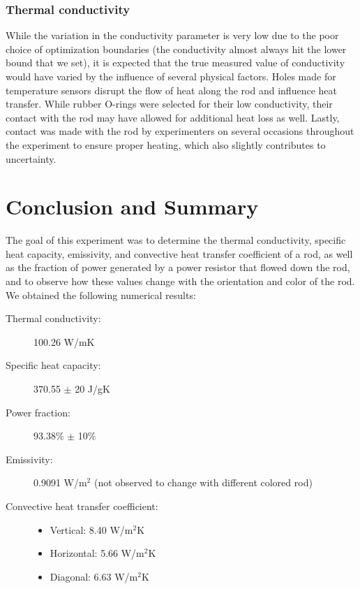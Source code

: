 \documentclass[letterpaper,titlepage,oneside]{report}
\begin{document}
\subsection*{Thermal conductivity}
While the variation in the conductivity parameter is very low due
to the poor choice of optimization boundaries (the conductivity almost
always hit the lower bound that we set), it is expected that the
true measured value of conductivity would have varied by the
influence of several physical factors. Holes made for temperature
sensors disrupt the flow of heat along the rod and influence
heat transfer. While rubber O-rings were selected for their
low conductivity, their contact with the rod may have allowed
for additional heat loss as well. Lastly, contact was made with
the rod by experimenters on several occasions throughout the
experiment to ensure proper heating, which also slightly
contributes to uncertainty. 

\chapter{Conclusion and Summary}
\label{ch:conclusion}
The goal of this experiment was to determine the thermal
conductivity, specific heat capacity, emissivity, and convective
heat transfer coefficient of a rod, as well as the fraction
of power generated by a power resistor that flowed down the rod,
and to observe how these values change with
the orientation and color of the rod.
\\
We obtained the following numerical results:
\begin{description}
\item [Thermal conductivity:] 100.26 W/mK
\item [Specific heat capacity:] 370.55 $\pm$ 20 J/gK
\item [Power fraction:] 93.38\% $\pm$ 10\%
\item [Emissivity:] 0.9091 W/m$^2$ (not observed to change with different colored rod)
\item [Convective heat transfer coefficient:]\hfill
  \begin{itemize}
  \item Vertical: 8.40 W/m$^2$K
  \item Horizontal: 5.66 W/m$^2$K
  \item Diagonal: 6.63 W/m$^2$K
  \end{itemize}
\end{description}
\end{document}
